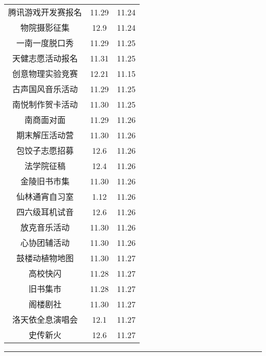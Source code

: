 \documentclass[letterpaper, 12pt]{article}
\begin{document}
\begin{multicols}{2}
{\begin{longtable}{|c|c|c|}
    腾讯游戏开发赛报名 & 11.29 & 11.24\\
    物院摄影征集 & 12.9 & 11.24\\
    一南一度脱口秀 & 11.29 & 11.25\\
    天健志愿活动报名 & 11.31 & 11.25\\
    创意物理实验竞赛 & 12.21 & 11.15\\
    古声国风音乐活动 & 11.29 & 11.25\\
    南悦制作贺卡活动 & 11.30 & 11.25\\
    南商面对面 & 11.29 & 11.26\\
    期末解压活动营 & 11.30 & 11.26\\
    包饺子志愿招募 & 12.6 & 11.26\\
    法学院征稿 & 12.4 & 11.26\\
    金陵旧书市集 & 11.30 & 11.26\\
    仙林通宵自习室 & 1.12 & 11.26\\
    四六级耳机试音 & 12.6 & 11.26\\
    放克音乐活动 & 11.30 & 11.26\\
    心协团辅活动 & 11.30 & 11.26\\
    鼓楼动植物地图 & 11.30 & 11.27\\
    高校快闪 & 11.28 & 11.27\\
    旧书集市 & 11.28 & 11.27\\
    阁楼剧社 & 11.30 & 11.27\\
    洛天依全息演唱会 & 12.1 & 11.27\\
    史传新火 & 12.6 & 11.27\\
    \hline
\end{longtable}
\unskip
\unpenalty
\unpenalty}\unvbox\colbbox
\end{multicols}
\hrule
\pagebreak
\end{document}
